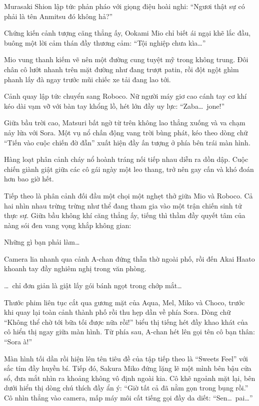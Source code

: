 \documentclass[../main.tex]{subfiles}
\begin{document}
Murasaki Shion lập tức phản pháo với giọng điệu hoài nghi: ``Ngươi thật sự có phải là tên Anmitsu đó không hả?''

Chứng kiến cảnh tượng căng thẳng ấy, Ookami Mio chỉ biết ái ngại khẽ lắc đầu, buông một lời cảm thán đầy thương cảm: ``Tội nghiệp chưa kìa\dots''

Mio vung thanh kiếm vẽ nên một đường cung tuyệt mỹ trong không trung. Đôi chân cô lướt nhanh trên mặt đường như đang trượt patin, rồi đột ngột ghìm phanh lấy đà ngay trước mũi chiếc xe tải đang lao tới.

Cảnh quay lập tức chuyển sang Roboco. Nữ người máy giơ cao cánh tay cơ khí kéo dài vạm vỡ với bàn tay khổng lồ, hét lớn đầy uy lực: ``Zaba\dots\ jone!''

Giữa bầu trời cao, Matsuri bất ngờ từ trên không lao thẳng xuống và va chạm nảy lửa với Sora. Một vụ nổ chấn động vang trời bùng phát, kéo theo dòng chữ ``Tiến vào cuộc chiến đờ đẫn'' xuất hiện đầy ấn tượng ở phía bên trái màn hình.

Hàng loạt phân cảnh cháy nổ hoành tráng nối tiếp nhau diễn ra dồn dập. Cuộc chiến giành giật giữa các cô gái ngày một leo thang, trở nên gay cấn và khó đoán hơn bao giờ hết.

Tiếp theo là phân cảnh đối đầu một chọi một nghẹt thở giữa Mio và Roboco. Cả hai nhìn nhau trừng trừng như thể đang tham gia vào một trận chiến sinh tử thực sự. Giữa bầu không khí căng thẳng ấy, tiếng thì thầm đầy quyết tâm của nàng sói đen vang vọng khắp không gian:
\begin{center}
  Những gì bạn phải làm\dots
\end{center}
Camera lia nhanh qua cảnh A-chan đứng thẫn thờ ngoài phố, rồi đến Akai Haato khoanh tay đầy nghiêm nghị trong văn phòng.
\begin{center}
  \dots\ chỉ đơn giản là giật lấy gói bánh ngọt trong chớp mắt\dots
\end{center}
Thước phim liên tục cắt qua gương mặt của Aqua, Mel, Miko và Choco, trước khi quay lại toàn cảnh thành phố rồi thu hẹp dần về phía Sora. Dòng chữ ``Không thể chờ tới bữa tối được nữa rồi!'' biểu thị tiếng hét đầy khao khát của cô hiển thị ngay giữa màn hình. Từ phía sau, A-chan hét lên gọi tên cô bạn thân: ``Sora à!''

Màn hình tối dần rồi hiện lên tên tiêu đề của tập tiếp theo là ``Sweets Feel'' với sắc tím đầy huyền bí. Tiếp đó, Sakura Miko đứng lặng lẽ một mình bên bậu cửa sổ, đưa mắt nhìn ra khoảng không vô định ngoài kia. Cô khẽ ngoảnh mặt lại, bên dưới hiển thị dòng chú thích đầy ẩn ý: ``Giờ tất cả đã nằm gọn trong bụng rồi.'' Cô nhìn thẳng vào camera, mấp máy môi cất tiếng gọi đầy da diết: ``Sen\dots\ pai\dots''
\end{document}
